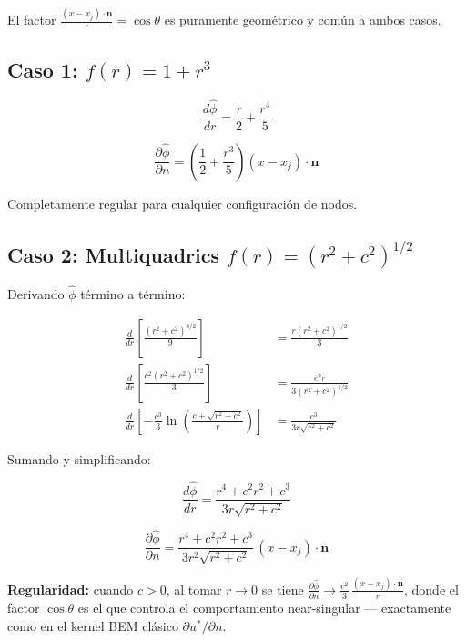 \documentclass[12pt,a4paper]{article}
\begin{document}
El factor $\frac{(x-x_j)\cdot\mathbf{n}}{r} = \cos\theta$ es puramente
geométrico y común a ambos casos.

\subsection{Caso 1: $f(r) = 1 + r^3$}

\begin{equation}
    \frac{d\hat{\phi}}{dr} = \frac{r}{2} + \frac{r^4}{5}
\end{equation}

\begin{equation}
\boxed{
    \frac{\partial\hat{\phi}}{\partial n}
    = \left(\frac{1}{2} + \frac{r^3}{5}\right)(x - x_j)\cdot\mathbf{n}
}
\end{equation}

Completamente regular para cualquier configuración de nodos.

\subsection{Caso 2: Multiquadrics $f(r) = (r^2+c^2)^{1/2}$}

Derivando $\hat{\phi}$ término a término:

\begin{align}
    \frac{d}{dr}\left[\frac{(r^2+c^2)^{3/2}}{9}\right]
    &= \frac{r(r^2+c^2)^{1/2}}{3} \\[0.5em]
    \frac{d}{dr}\left[\frac{c^2(r^2+c^2)^{1/2}}{3}\right]
    &= \frac{c^2 r}{3(r^2+c^2)^{1/2}} \\[0.5em]
    \frac{d}{dr}\left[-\frac{c^3}{3}
    \ln\!\left(\frac{c+\sqrt{r^2+c^2}}{r}\right)\right]
    &= \frac{c^3}{3r\sqrt{r^2+c^2}}
\end{align}

Sumando y simplificando:

\begin{equation}
    \frac{d\hat{\phi}}{dr} = \frac{r^4 + c^2 r^2 + c^3}{3r\sqrt{r^2+c^2}}
\end{equation}

\begin{equation}
\boxed{
    \frac{\partial\hat{\phi}}{\partial n}
    = \frac{r^4 + c^2 r^2 + c^3}{3r^2\sqrt{r^2+c^2}}
    \,(x - x_j)\cdot\mathbf{n}
}
\end{equation}

\textbf{Regularidad:} cuando $c>0$, al tomar $r\to 0$ se tiene
$\frac{\partial\hat{\phi}}{\partial n} \to \frac{c^2}{3}\,\frac{(x-x_j)\cdot\mathbf{n}}{r}$,
donde el factor $\cos\theta$ es el que controla el comportamiento near-singular —
exactamente como en el kernel BEM clásico $\partial u^*/\partial n$.
\end{document}

